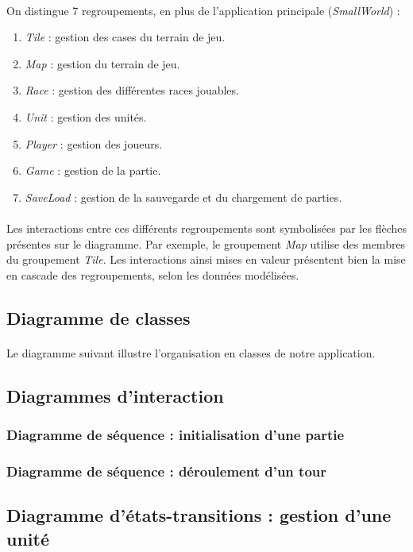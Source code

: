 \documentclass[a4paper]{article}
\begin{document}
\paragraph{}
On distingue 7 regroupements, en plus de l'application principale (\textit{SmallWorld}) :
\begin{enumerate}
\item \textit{Tile} : gestion des cases du terrain de jeu.
\item \textit{Map} : gestion du terrain de jeu.
\item \textit{Race} : gestion des différentes races jouables.
\item \textit{Unit} : gestion des unités.
\item \textit{Player} : gestion des joueurs.
\item \textit{Game} : gestion de la partie.
\item \textit{SaveLoad} : gestion de la sauvegarde et du chargement de parties.
\end{enumerate}

\paragraph{}
Les interactions entre ces différents regroupements sont symbolisées par les flèches présentes sur le diagramme. Par exemple, le groupement \textit{Map} utilise des membres du groupement \textit{Tile}. Les interactions ainsi mises en valeur présentent bien la mise en cascade des regroupements, selon les données modélisées.



\subsection{Diagramme de classes}
\label{DDC}
\paragraph{}
Le diagramme suivant illustre l'organisation en classes de notre application.



\subsection{Diagrammes d'interaction}

\subsubsection{Diagramme de séquence : initialisation d'une partie}



\subsubsection{Diagramme de séquence : déroulement d'un tour}



\subsection{Diagramme d'états-transitions : gestion d'une unité}


\end{document}
